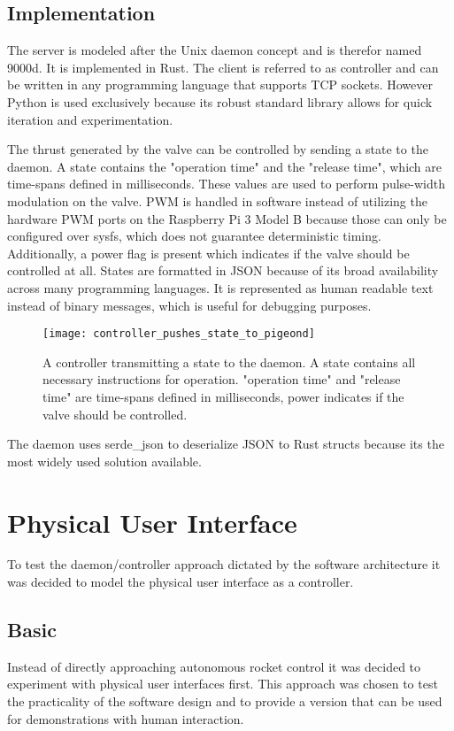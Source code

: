 \subsection{Implementation}
The server is modeled after the Unix daemon concept and is therefor named 9000d. It is implemented in Rust. The client is referred to as controller and can be written in any programming language that supports TCP sockets. However Python is used exclusively because its robust standard library allows for quick iteration and experimentation.

The thrust generated by the valve can be controlled by sending a state to the daemon. A state contains the "operation time" and the "release time", which are time-spans defined in milliseconds. These values are used to perform pulse-width modulation on the valve. PWM is handled in software instead of utilizing the hardware PWM ports on the Raspberry Pi 3 Model B because those can only be configured over sysfs, which does not guarantee deterministic timing. Additionally, a power flag is present which indicates if the valve should be controlled at all. States are formatted in JSON \cite{json} because of its broad availability across many programming languages. It is represented as human readable text instead of binary messages, which is useful for debugging purposes. 

\begin{figure}[H]
\centering

\texttt{[image: controller\_pushes\_state\_to\_pigeond]}

\caption{A controller transmitting a state to the daemon. A state contains all necessary instructions for operation. "operation time" and "release time" are time-spans defined in milliseconds, power indicates if the valve should be controlled.}
\end{figure}

The daemon uses serde\_json to deserialize JSON to Rust structs because its the most widely used solution available.

\section{Physical User Interface}
\author{Philip Trauner}

To test the daemon/controller approach dictated by the software architecture it was decided to model the physical user interface as a controller.

\subsection{Basic}
Instead of directly approaching autonomous rocket control it was decided to experiment with physical user interfaces first. This approach was chosen to test the practicality of the software design and to provide a version that can be used for demonstrations with human interaction. 

